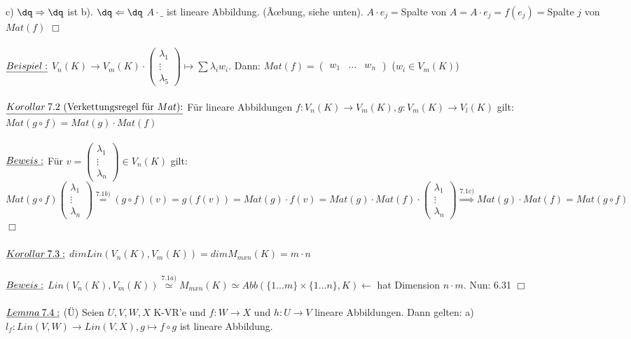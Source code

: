 \documentclass[fleqn, a4paper, 11pt]{scrartcl}
\theoremstyle{definition}
\begin{document}
c) $\dq\Rightarrow\dq$ ist b). $\dq\Leftarrow\dq$ $A\cdot\_$ ist lineare Abbildung. (Ãœbung, siehe unten). $A\cdot e_j=$Spalte von $A=A\cdot e_j=f(e_j)=$Spalte $j$ von $Mat(f)$ \hfill $\Box$\\
\\
$\uline{Beispiel:}$ $V_n(K)\rightarrow V_m(K)\cdot\begin{pmatrix}
	\lambda_1\\
	\vdots\\
	\lambda_5
\end{pmatrix} \mapsto\sum\lambda_i w_i$. Dann: $Mat(f)=\begin{pmatrix}
	w_1 & \dots & w_n
\end{pmatrix}$ ($w_i\in V_m(K)$)\\
\\
$\uline{Korollar\:7.2\text{ (Verkettungsregel für $Mat$):}}$ Für lineare Abbildungen $f:V_n(K)\rightarrow V_m(K),g:V_m(K)\rightarrow V_l(K)$ gilt: $Mat(g\circ f)=Mat(g)\cdot Mat(f)$\\
\\
$\uline{Beweis:}$ Für $v=\begin{pmatrix}
	\lambda_1\\
	\vdots\\
	\lambda_n
\end{pmatrix}\in V_n(K)$ gilt: $Mat(g\circ f)\begin{pmatrix}
	\lambda_1\\
	\vdots\\
	\lambda_n
\end{pmatrix}\stackrel{7.1b)}{=}(g\circ f)(v)=g(f(v))=Mat(g)\cdot f(v)=Mat(g)\cdot Mat(f)\cdot\begin{pmatrix}
	\lambda_1\\
	\vdots\\
	\lambda_n
\end{pmatrix}\stackrel{7.1c)}{\Rightarrow} Mat(g)\cdot Mat(f)=Mat(g\circ f)$ \hfill $\Box$\\
\\
$\uline{Korollar\:7.3:}$ $dim Lin(V_n(K),V_m(K))=dim M_{mxn}(K)=m\cdot n$\\
\\
$\uline{Beweis:}$ $Lin(V_n(K),V_m(K))\stackrel{7.1a)}{\simeq}M_{mxn}(K)\simeq Abb(\{1...m\}\times\{1...n\},K)\leftarrow$ hat Dimension $n\cdot m$. Nun: 6.31 \hfill $\Box$\\
\\
$\uline{Lemma\:7.4:}$ (\"U) Seien $U,V,W,X$ K-VR'e und $f:W\rightarrow X$ und $h:U\rightarrow V$ lineare Abbildungen. Dann gelten: a) $l_f:Lin(V,W)\rightarrow Lin(V,X),g\mapsto f\circ g$ ist lineare Abbildung.\\
\end{document}

